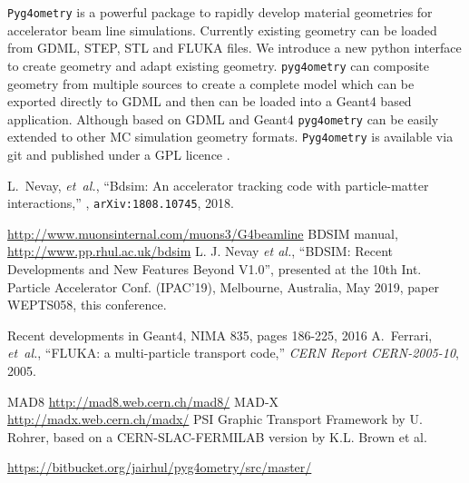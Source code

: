 \documentclass[a4paper,
               keeplastbox,   %
               ]{jacow}
\begin{document}
\verb|Pyg4ometry| is a powerful package to rapidly develop material geometries for accelerator beam line simulations. Currently existing geometry can
be loaded from GDML, STEP, STL and FLUKA files. We introduce a new python interface to create geometry and adapt existing geometry. \verb|pyg4ometry| 
can composite geometry from multiple sources to create a complete model which can be exported directly to GDML and then can be loaded into a Geant4 
based application. Although based on GDML and Geant4 \verb|pyg4ometry| can be easily extended to other MC simulation geometry formats. \verb|Pyg4ometry| is 
available via git and published under a GPL licence \cite{pyg4omtery-git}.   

%
%

%
	{\printbibliography}%
	{%
	
	\begin{thebibliography}{9} %
	
	 L.~Nevay, \emph{ et~al.}, ``Bdsim: An accelerator tracking code with particle-matter interactions,'' , {\tt arXiv:1808.10745}, 2018.
	
	 \url{http://www.muonsinternal.com/muons3/G4beamline}
	  BDSIM manual, \url{http://www.pp.rhul.ac.uk/bdsim}
	 L. J. Nevay \emph{et al.}, \textquotedblleft{BDSIM: Recent Developments and New Features Beyond V1.0}\textquotedblright, presented at the 10th Int. Particle Accelerator Conf. (IPAC'19), Melbourne, Australia, May 2019, paper WEPTS058, this conference.
	
	 Recent developments in Geant4, NIMA 835, pages 186-225, 2016 	
	 A.~Ferrari, {\em et~al.}, ``{FLUKA}: a multi-particle transport code,'' {\em   CERN Report CERN-2005-10}, 2005.

	 MAD8 \url{http://mad8.web.cern.ch/mad8/}
	 MAD-X \url{http://madx.web.cern.ch/madx/}
	 PSI Graphic Transport Framework by U. Rohrer, based on a CERN-SLAC-FERMILAB version by K.L. Brown et al. 
	
	 \url{https://bitbucket.org/jairhul/pyg4ometry/src/master/}

	\end{thebibliography}
} %
\end{document}
